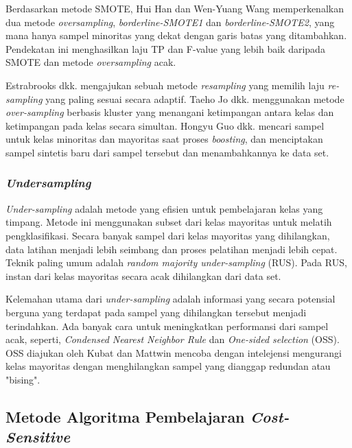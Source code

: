 \documentclass[12pt,a4paper,titlepage]{article}
\begin{document}
Berdasarkan metode SMOTE, Hui Han dan Wen-Yuang Wang \cite{han2005borderline} memperkenalkan dua metode \textit{oversampling}, \textit{borderline-SMOTE1} dan \textit{borderline-SMOTE2}, yang mana hanya sampel minoritas yang dekat dengan garis batas yang ditambahkan. Pendekatan ini menghasilkan laju TP dan F-value yang lebih baik daripada SMOTE dan metode \textit{oversampling} acak.

Estrabrooks dkk. \cite{estabrooks2004multiple} mengajukan sebuah metode \textit{resampling} yang memilih laju \textit{re-sampling} yang paling sesuai secara adaptif. Taeho Jo dkk. \cite{jo2004class} menggunakan metode \textit{over-sampling} berbasis kluster yang menangani ketimpangan antara kelas dan ketimpangan pada kelas secara simultan. Hongyu Guo dkk. \cite{guo2004learning} mencari sampel untuk kelas minoritas dan mayoritas saat proses \textit{boosting}, dan menciptakan sampel sintetis baru dari sampel tersebut dan menambahkannya ke data set.


\subsubsection{\textit{Undersampling}}\label{subsubsec:undersampling}

\textit{Under-sampling} adalah metode yang efisien untuk pembelajaran kelas yang timpang. Metode ini menggunakan subset dari kelas mayoritas untuk melatih pengklasifikasi. Secara banyak sampel dari kelas mayoritas yang dihilangkan, data latihan menjadi lebih seimbang dan proses pelatihan menjadi lebih cepat. Teknik paling umum adalah \textit{random majority under-sampling} (RUS). Pada RUS, instan dari kelas mayoritas secara acak dihilangkan dari data set.

Kelemahan utama dari \textit{under-sampling} adalah informasi yang secara potensial berguna yang terdapat pada sampel yang dihilangkan tersebut menjadi terindahkan. Ada banyak cara untuk meningkatkan performansi dari sampel acak, seperti, \textit{Condensed Nearest Neighbor Rule} dan \textit{One-sided selection} (OSS). OSS diajukan oleh Kubat dan Mattwin \cite{kubat1997addressing} mencoba dengan intelejensi mengurangi kelas mayoritas dengan menghilangkan sampel yang dianggap redundan atau "bising".

\subsection{Metode Algoritma Pembelajaran \textit{Cost-Sensitive}}
\end{document}
